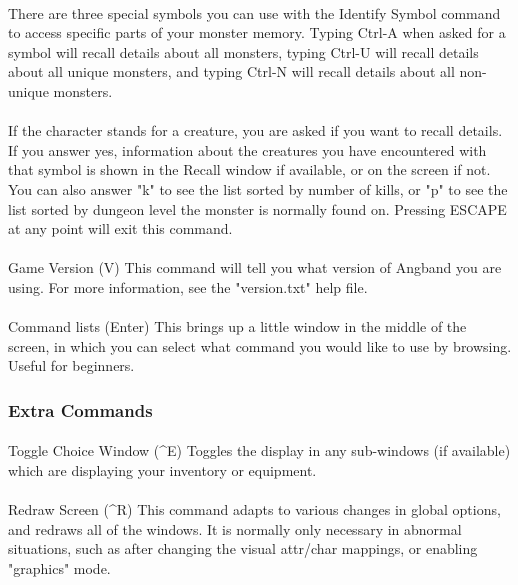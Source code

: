 \paragraph{}There are three special symbols you can use with the
Identify Symbol command to access specific parts of your monster memory.
Typing Ctrl-A when asked for a symbol will recall details about all
monsters, typing Ctrl-U will recall details about all unique monsters,
and typing Ctrl-N will recall details about all non-unique monsters.

\paragraph{}If the character stands for a creature, you are
asked if you want to recall details. If you answer yes,
information about the creatures you have encountered with that
symbol is shown in the Recall window if available, or on the
screen if not. You can also answer "k" to see the list sorted by
number of kills, or "p" to see the list sorted by dungeon level
the monster is normally found on. Pressing ESCAPE at any point
will exit this command.

\paragraph{}Game Version (V) This command will tell you what
version of Angband you are using.  For more information, see the
"version.txt" help file.

\paragraph{}Command lists (Enter) This brings up a little window in the
middle of the screen, in which you can select what command you would
like to use by browsing.  Useful for beginners.

\subsubsection{Extra Commands} 
\paragraph{}Toggle Choice Window (\^{}E)
Toggles the display in any sub-windows (if available) which are
displaying your inventory or equipment.

\paragraph{}Redraw Screen (\^{}R) This command adapts to various changes
in global options, and redraws all of the windows. It is normally only
necessary in abnormal situations, such as after changing the visual
attr/char mappings, or enabling "graphics" mode.

